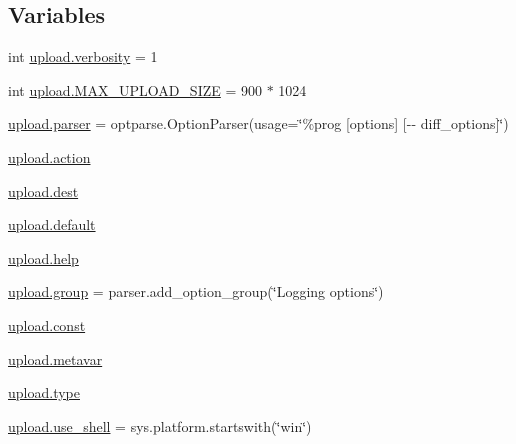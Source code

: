 \subsection*{Variables}
\begin{DoxyCompactItemize}
\item 
int \mbox{\hyperlink{namespaceupload_a79aff46409a98c4e5f608c8df1fd4612}{upload.\+verbosity}} = 1
\item 
int \mbox{\hyperlink{namespaceupload_aad5b1a43823e2a710a2f78e33dde8901}{upload.\+M\+A\+X\+\_\+\+U\+P\+L\+O\+A\+D\+\_\+\+S\+I\+ZE}} = 900 $\ast$ 1024
\item 
\mbox{\hyperlink{namespaceupload_af9e508d19dc2dd9cdb7c642dde0bdd21}{upload.\+parser}} = optparse.\+Option\+Parser(usage=\char`\"{}\%prog \mbox{[}options\mbox{]} \mbox{[}-\/-\/ diff\+\_\+options\mbox{]}\char`\"{})
\item 
\mbox{\hyperlink{namespaceupload_a675d13c979f1c720866d22ed1736f580}{upload.\+action}}
\item 
\mbox{\hyperlink{namespaceupload_a770d9c7b49b1fede80de6078d5e49af7}{upload.\+dest}}
\item 
\mbox{\hyperlink{namespaceupload_af4be925d9a50d5ad134d86400509d0f2}{upload.\+default}}
\item 
\mbox{\hyperlink{namespaceupload_abfc23c9aa2d9b777678da117a85929a5}{upload.\+help}}
\item 
\mbox{\hyperlink{namespaceupload_a9d33d66de17175dced88ffe95f079226}{upload.\+group}} = parser.\+add\+\_\+option\+\_\+group(\char`\"{}Logging options\char`\"{})
\item 
\mbox{\hyperlink{namespaceupload_a985aa9a71de3eb507344df65700c696d}{upload.\+const}}
\item 
\mbox{\hyperlink{namespaceupload_af1cea8af5389f0ab2d8b65b2c0fd2fe0}{upload.\+metavar}}
\item 
\mbox{\hyperlink{namespaceupload_a4fc56f0dd6613be15c3c4dc3af3619ce}{upload.\+type}}
\item 
\mbox{\hyperlink{namespaceupload_afa85ceef00a65cd276a856404eb5f310}{upload.\+use\+\_\+shell}} = sys.\+platform.\+startswith(\char`\"{}win\char`\"{})
\end{DoxyCompactItemize}
